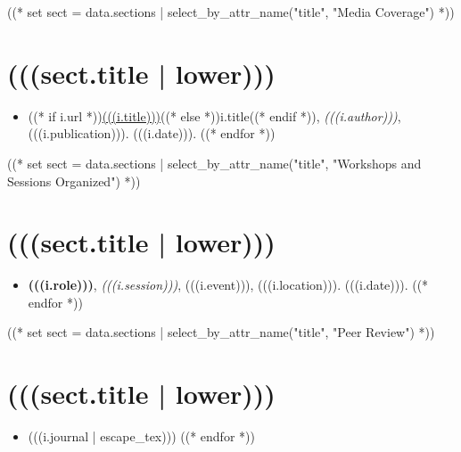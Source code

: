 \documentclass[11pt,article,oneside]{memoir}
\begin{document}
((* set sect = data.sections | select_by_attr_name("title", "Media Coverage") *))
\section{(((sect.title | lower)))}

\mbox{}\vspace{-\dimexpr\baselineskip\relax}

\begin{itemize}[label={}]
  ((* for i in sect.entries.media | sort(attribute="date", reverse=True) *))
  \item ((* if i.url *))\href{(((i.url)))}{(((i.title)))}((* else *))i.title((* endif *)), \textit{(((i.author)))}, (((i.publication))). (((i.date))).
        ((* endfor *))
\end{itemize}

((* set sect = data.sections | select_by_attr_name("title", "Workshops and Sessions Organized") *))
\section{(((sect.title | lower)))}

\mbox{}\vspace{-\dimexpr\baselineskip\relax}

\begin{itemize}[label={}]
  ((* for i in sect.entries.convene | sort(attribute="date", reverse=True) *))
  \item \textbf{(((i.role)))}, \textit{(((i.session)))}, (((i.event))), (((i.location))). (((i.date))).
        ((* endfor *))
\end{itemize}

((* set sect = data.sections | select_by_attr_name("title", "Peer Review") *))
\section{(((sect.title | lower)))}

\mbox{}\vspace{-\dimexpr\baselineskip\relax}

\begin{itemize}[label={}]
  ((* for i in sect.entries.peerreview | sort(attribute="journal") *))
  \item (((i.journal | escape_tex)))
        ((* endfor *))
\end{itemize}
\end{document}
